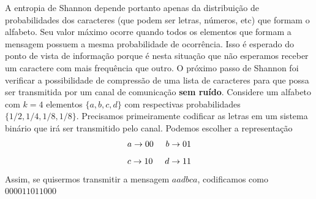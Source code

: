\documentclass{article}
\begin{document}
A entropia de Shannon depende portanto apenas da distribuição de probabilidades dos caracteres (que podem ser letras, números, etc) que formam o alfabeto. Seu valor máximo ocorre quando todos os elementos que formam a mensagem possuem a mesma probabilidade de ocorrência. Isso é esperado do ponto de vista de informação porque é nesta situação que não esperamos receber um caractere com mais frequência que outro. O próximo passo de Shannon foi verificar a possibilidade de compressão de uma lista de caracteres para que possa ser transmitida por um canal de comunicação \textbf{sem ruído}. Considere um alfabeto com $k = 4$ elementos $\{ a,b,c,d \}$ com respectivas probabilidades $\{ 1/2,1/4,1/8,1/8  \}$. Precisamos primeiramente codificar as letras em um sistema binário que irá ser transmitido pelo canal. Podemos escolher a representação
\begin{equation}
    a \rightarrow 00 \hspace{0.5cm} b \rightarrow 01
\end{equation}
\begin{equation}
    c \rightarrow 10 \hspace{0.5cm} d \rightarrow 11
\end{equation}
Assim, se quisermos transmitir a mensagem $aadbca$, codificamos como $000011011000$
\end{document}
